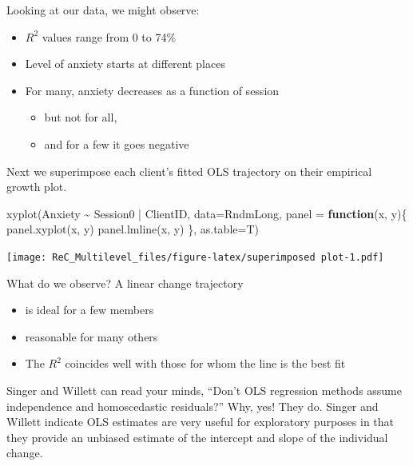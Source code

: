 \documentclass[
  11pt,
]{book}
\newenvironment{Shaded}{\begin{snugshade}}{\end{snugshade}}
\newcommand{\AttributeTok}[1]{\textcolor[rgb]{0.77,0.63,0.00}{#1}}
\newcommand{\ControlFlowTok}[1]{\textcolor[rgb]{0.13,0.29,0.53}{\textbf{#1}}}
\newcommand{\FunctionTok}[1]{\textcolor[rgb]{0.00,0.00,0.00}{#1}}
\newcommand{\NormalTok}[1]{#1}
\newcommand{\SpecialCharTok}[1]{\textcolor[rgb]{0.00,0.00,0.00}{#1}}
\providecommand{\tightlist}{%
  \setlength{\itemsep}{0pt}\setlength{\parskip}{0pt}}
\begin{document}
Looking at our data, we might observe:

\begin{itemize}
\tightlist
\item
  \(R^2\) values range from 0 to 74\%
\item
  Level of anxiety starts at different places
\item
  For many, anxiety decreases as a function of session

  \begin{itemize}
  \tightlist
  \item
    but not for all,
  \item
    and for a few it goes negative
  \end{itemize}
\end{itemize}

Next we superimpose each client's fitted OLS trajectory on their empirical growth plot.

\begin{Shaded}
\begin{Highlighting}[]
\FunctionTok{xyplot}\NormalTok{(Anxiety }\SpecialCharTok{\textasciitilde{}}\NormalTok{ Session0 }\SpecialCharTok{|}\NormalTok{ ClientID, }\AttributeTok{data=}\NormalTok{RndmLong,}
  \AttributeTok{panel =} \ControlFlowTok{function}\NormalTok{(x, y)\{}
    \FunctionTok{panel.xyplot}\NormalTok{(x, y)}
    \FunctionTok{panel.lmline}\NormalTok{(x, y)}
\NormalTok{  \},  }\AttributeTok{as.table=}\NormalTok{T)}
\end{Highlighting}
\end{Shaded}

\texttt{[image: ReC\_Multilevel\_files/figure-latex/superimposed plot-1.pdf]}

What do we observe? A linear change trajectory

\begin{itemize}
\tightlist
\item
  is ideal for a few members
\item
  reasonable for many others
\item
  The \(R^2\) coincides well with those for whom the line is the best fit
\end{itemize}

Singer and Willett \citeyearpar{singer_applied_2003} can read your minds, ``Don't OLS regression methods assume independence and homoscedastic residuals?'' Why, yes! They do. Singer and Willett indicate OLS estimates are very useful for exploratory purposes in that they provide an unbiased estimate of the intercept and slope of the individual change.
\end{document}
